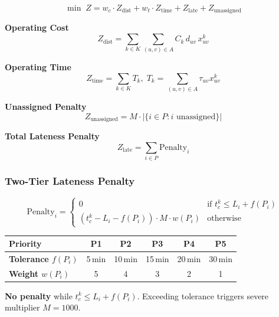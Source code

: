 \documentclass[11pt,a4paper]{article}
\begin{document}
\begin{equation}
\min \; Z = w_c \cdot Z_{\text{dist}} + w_t \cdot Z_{\text{time}} + Z_{\text{late}} + Z_{\text{unassigned}}
\end{equation}

\begin{minipage}[t]{0.48\textwidth}
\textbf{Operating Cost}
\begin{equation}
Z_{\text{dist}} = \sum_{k \in K} \sum_{(u,v)\in A} C_k \, d_{uv} \, x_{uv}^k
\end{equation}

\textbf{Operating Time}
\begin{equation}
Z_{\text{time}} = \sum_{k \in K} T_k,\; T_k = \sum_{(u,v) \in A} \tau_{uv} x_{uv}^k
\end{equation}
\end{minipage}
\hfill
\begin{minipage}[t]{0.48\textwidth}
\textbf{Unassigned Penalty}
\begin{equation}
Z_{\text{unassigned}} = M \cdot |\{i \in P : i \text{ unassigned}\}|
\end{equation}

\textbf{Total Lateness Penalty}
\begin{equation}
Z_{\text{late}} = \sum_{i \in P} \text{Penalty}_i
\end{equation}
\end{minipage}

\subsubsection{Two-Tier Lateness Penalty}

\begin{equation}
\text{Penalty}_i = 
\begin{cases}
0 & \text{if } t_c^k \leq L_i + f(P_i) \\[3pt]
(t_c^k - L_i - f(P_i)) \cdot M \cdot w(P_i) & \text{otherwise}
\end{cases}
\end{equation}

\begin{insightbox}
\small
\begin{tabular}{lccccc}
\toprule
\textbf{Priority} & P1 & P2 & P3 & P4 & P5 \\
\midrule
\textbf{Tolerance $f(P_i)$} & 5\,min & 10\,min & 15\,min & 20\,min & 30\,min \\
\textbf{Weight $w(P_i)$} & 5 & 4 & 3 & 2 & 1 \\
\bottomrule
\end{tabular}

\vspace{2pt}
\textbf{No penalty} while $t_c^k \le L_i + f(P_i)$. Exceeding tolerance triggers severe multiplier $M = 1000$.
\end{insightbox}
\end{document}
